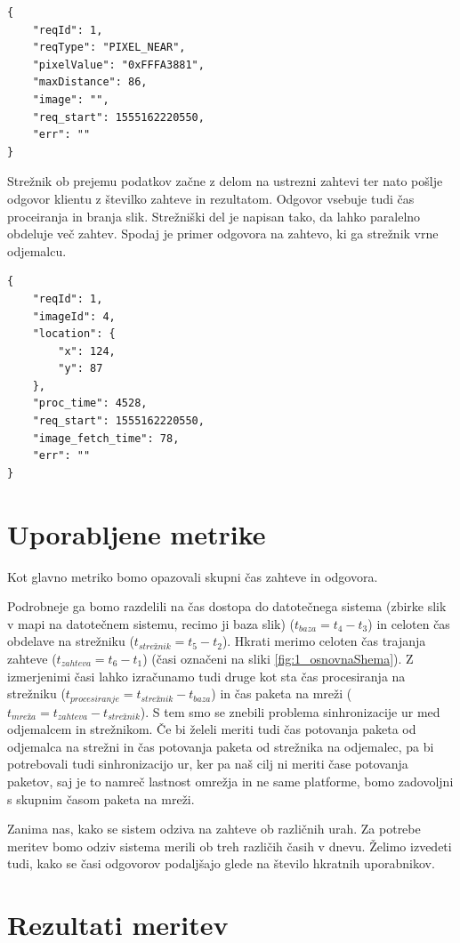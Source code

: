 \begin{lstlisting}
{
	"reqId": 1,
	"reqType": "PIXEL_NEAR",
	"pixelValue": "0xFFFA3881",
	"maxDistance": 86,
	"image": "",
	"req_start": 1555162220550,
	"err": ""
}
\end{lstlisting}

Strežnik ob prejemu podatkov začne z delom na ustrezni zahtevi ter nato pošlje odgovor klientu z številko zahteve in rezultatom. Odgovor vsebuje tudi čas proceiranja in branja slik. Strežniški del je napisan tako, da lahko paralelno obdeluje več zahtev. Spodaj je primer odgovora na zahtevo, ki ga strežnik vrne odjemalcu.

\begin{lstlisting}
{
	"reqId": 1,
	"imageId": 4,
	"location": {
		"x": 124,
		"y": 87	
	},
	"proc_time": 4528,
	"req_start": 1555162220550,
	"image_fetch_time": 78,
	"err": ""
}
\end{lstlisting}

\section{Uporabljene metrike}

Kot glavno metriko bomo opazovali skupni čas zahteve in odgovora.

Podrobneje ga bomo razdelili na čas dostopa do datotečnega sistema (zbirke slik v mapi na datotečnem sistemu, recimo ji baza slik) ($t_{baza} = t_4 - t_3$) in celoten čas obdelave na strežniku ($t_{strežnik} = t_5 - t_2$). Hkrati merimo celoten čas trajanja zahteve ($t_{zahteva} = t_6 - t_1$) (časi označeni na sliki \ref{fig:1_osnovnaShema}). Z izmerjenimi časi lahko izračunamo tudi druge kot sta čas procesiranja na strežniku ($t_{procesiranje} = t_{strežnik} - t_{baza}$) in čas paketa na mreži ($t_{mreža} = t_{zahteva} - t_{strežnik}$). S tem smo se znebili problema sinhronizacije ur med odjemalcem in strežnikom. Če bi želeli meriti tudi čas potovanja paketa od odjemalca na strežni in čas potovanja paketa od strežnika na odjemalec, pa bi potrebovali tudi sinhronizacijo ur, ker pa naš cilj ni meriti čase potovanja paketov, saj je to namreč lastnost omrežja in ne same platforme, bomo zadovoljni s skupnim časom paketa na mreži.

Zanima nas, kako se sistem odziva na zahteve ob različnih urah. Za potrebe meritev bomo odziv sistema merili ob treh različih časih v dnevu. Želimo izvedeti tudi, kako se časi odgovorov podaljšajo glede na število hkratnih uporabnikov.

\section{Rezultati meritev} %

